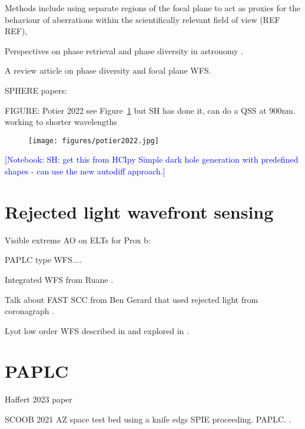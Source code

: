 \documentclass[letterpaper]{ar-1col}
\newcommand{\notebooksuggestion}[1]{\textcolor{blue}{[Notebook: #1]}}
\begin{document}
Methods include using separate regions of the focal plane to act as proxies for the behaviour of aberrations within the scientifically relevant field of view (REF REF), 

Perspectives on phase retrieval and phase diversity in astronomy \citet{Gonsalves14}.

A review article on phase diversity and focal plane WFS. \citep{Fienup13}


SPHERE papers:

FIGURE: Potier 2022 see Figure~\ref{fig:fpwfsclean} but SH has done it, can do a QSS at 900nm. working to shorter wavelengths

\begin{figure}[ht]
  \centering
  \texttt{[image: figures/potier2022.jpg]}
  \caption{}
  \label{fig:fpwfsclean}
\end{figure}

\notebooksuggestion{SH: get this from HCIpy Simple dark hole generation with predefined shapes - can use the new autodiff approach.}

\lipsum[2-4]

\section{Rejected light wavefront sensing} 

Visible extreme AO on ELTs for Prox b: \citep{Fowler23}

PAPLC type WFS....

Integrated WFS from Ruane \citep{Ruane20}.

Talk about FAST SCC from Ben Gerard that used rejected light from coronagraph \citep{Gerard18}.


Lyot low order WFS described in \citet{Guyon09} and explored in \citet{Singh14,Singh15}.


\lipsum[2-4]

\section{PAPLC}

\citet{Por20} 

Haffert 2023 paper

SCOOB 2021 AZ space test bed \citep{Ashcraft22} using a knife edgs SPIE proceeding. PAPLC. \citep{vanGorkom22}.
\end{document}
